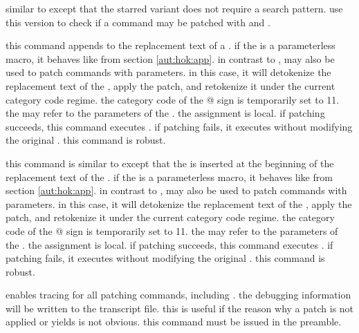 \begin{ltxsyntax}

similar to  except that the starred variant does not require a search pattern. use this version to check if a command may be patched with  and .


this command appends  to the replacement text of a . if the  is a parameterless macro, it behaves like  from section \ref{aut:hok:app}. in contrast to ,  may also be used to patch commands with parameters. in this case, it will detokenize the replacement text of the , apply the patch, and retokenize it under the current category code regime. the category code of the @ sign is temporarily set to 11. the  may refer to the parameters of the . the assignment is local. if patching succeeds, this command executes . if patching fails, it executes  without modifying the original . this command is robust.


this command is similar to  except that the  is inserted at the beginning of the replacement text of the . if the  is a parameterless macro, it behaves like  from section \ref{aut:hok:app}. in contrast to ,  may also be used to patch commands with parameters. in this case, it will detokenize the replacement text of the , apply the patch, and retokenize it under the current category code regime. the category code of the @ sign is temporarily set to 11. the  may refer to the parameters of the . the assignment is local. if patching succeeds, this command executes . if patching fails, it executes  without modifying the original . this command is robust.


enables tracing for all patching commands, including . the debugging information will be written to the transcript file. this is useful if the reason why a patch is not applied or  yields  is not obvious. this command must be issued in the preamble.

\end{ltxsyntax}

